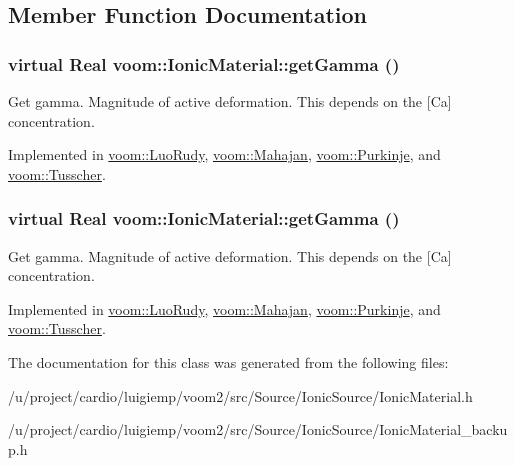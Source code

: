 \subsection{Member Function Documentation}
\hypertarget{classvoom_1_1_ionic_material_a98f1fa5bc5fa9ff6abfcd302111f8eac}{
\subsubsection[{getGamma}]{\setlength{\rightskip}{0pt plus 5cm}virtual Real voom::IonicMaterial::getGamma ()}}
\label{classvoom_1_1_ionic_material_a98f1fa5bc5fa9ff6abfcd302111f8eac}
Get gamma. Magnitude of active deformation. This depends on the \mbox{[}Ca\mbox{]} concentration. 

Implemented in \hyperlink{classvoom_1_1_luo_rudy_a698189fa1a8c96e7b443f95a9d7887be}{voom::LuoRudy}, \hyperlink{classvoom_1_1_mahajan_a909c20c75a95d45e00ead8930b4b3287}{voom::Mahajan}, \hyperlink{classvoom_1_1_purkinje_a337aa8f4b1ea0bd6f08635950cc39a2d}{voom::Purkinje}, and \hyperlink{classvoom_1_1_tusscher_a1c3c2dd28860736ebeb0f602a6b8caa8}{voom::Tusscher}.\hypertarget{classvoom_1_1_ionic_material_a98f1fa5bc5fa9ff6abfcd302111f8eac}{
\subsubsection[{getGamma}]{\setlength{\rightskip}{0pt plus 5cm}virtual Real voom::IonicMaterial::getGamma ()}}
\label{classvoom_1_1_ionic_material_a98f1fa5bc5fa9ff6abfcd302111f8eac}
Get gamma. Magnitude of active deformation. This depends on the \mbox{[}Ca\mbox{]} concentration. 

Implemented in \hyperlink{classvoom_1_1_luo_rudy_a698189fa1a8c96e7b443f95a9d7887be}{voom::LuoRudy}, \hyperlink{classvoom_1_1_mahajan_a909c20c75a95d45e00ead8930b4b3287}{voom::Mahajan}, \hyperlink{classvoom_1_1_purkinje_a337aa8f4b1ea0bd6f08635950cc39a2d}{voom::Purkinje}, and \hyperlink{classvoom_1_1_tusscher_a1c3c2dd28860736ebeb0f602a6b8caa8}{voom::Tusscher}.

The documentation for this class was generated from the following files:\begin{DoxyCompactItemize}
\item 
/u/project/cardio/luigiemp/voom2/src/Source/IonicSource/IonicMaterial.h\item 
/u/project/cardio/luigiemp/voom2/src/Source/IonicSource/IonicMaterial\_\-backup.h\end{DoxyCompactItemize}
